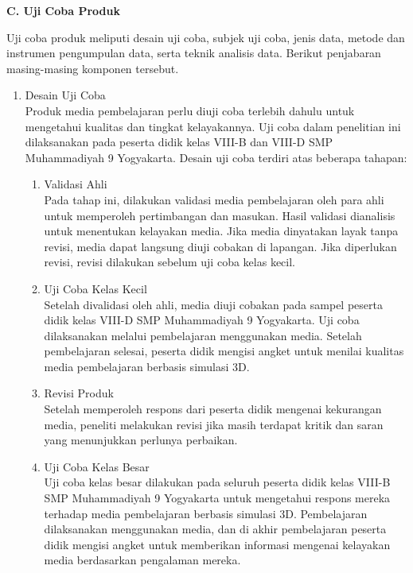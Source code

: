 \textbf{C. Uji Coba Produk}

\hspace*{1cm}Uji coba produk meliputi desain uji coba, subjek uji coba, jenis data, metode dan instrumen pengumpulan data, serta teknik analisis data. Berikut penjabaran masing-masing komponen tersebut.
\begin{enumerate}
    \item Desain Uji Coba\\
    \hspace*{1cm}Produk media pembelajaran perlu diuji coba terlebih dahulu untuk mengetahui kualitas dan tingkat kelayakannya. Uji coba dalam penelitian ini dilaksanakan pada peserta didik kelas VIII-B dan VIII-D SMP Muhammadiyah 9 Yogyakarta. Desain uji coba terdiri atas beberapa tahapan:
    \begin{enumerate}
        \item Validasi Ahli\\
        \hspace*{1cm}Pada tahap ini, dilakukan validasi media pembelajaran oleh para ahli untuk memperoleh pertimbangan dan masukan. Hasil validasi dianalisis untuk menentukan kelayakan media. Jika media dinyatakan layak tanpa revisi, media dapat langsung diuji cobakan di lapangan. Jika diperlukan revisi, revisi dilakukan sebelum uji coba kelas kecil.
        \item Uji Coba Kelas Kecil\\
        \hspace*{1cm}Setelah divalidasi oleh ahli, media diuji cobakan pada sampel peserta didik kelas VIII-D SMP Muhammadiyah 9 Yogyakarta. Uji coba dilaksanakan melalui pembelajaran menggunakan media. Setelah pembelajaran selesai, peserta didik mengisi angket untuk menilai kualitas media pembelajaran berbasis simulasi 3D.
        \item Revisi Produk\\
        \hspace*{1cm}Setelah memperoleh respons dari peserta didik mengenai kekurangan media, peneliti melakukan revisi jika masih terdapat kritik dan saran yang menunjukkan perlunya perbaikan.
        \item Uji Coba Kelas Besar\\
        \hspace*{1cm}Uji coba kelas besar dilakukan pada seluruh peserta didik kelas VIII-B SMP Muhammadiyah 9 Yogyakarta untuk mengetahui respons mereka terhadap media pembelajaran berbasis simulasi 3D. Pembelajaran dilaksanakan menggunakan media, dan di akhir pembelajaran peserta didik mengisi angket untuk memberikan informasi mengenai kelayakan media berdasarkan pengalaman mereka.
    \end{enumerate}


\end{enumerate}
